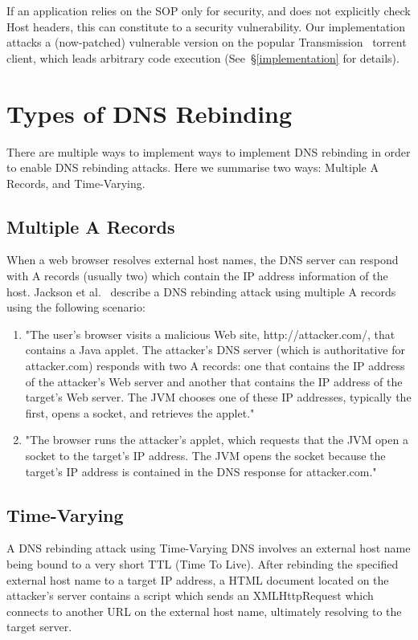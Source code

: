 If an application relies on the SOP only for security, and does not explicitly
check Host headers, this can constitute to a security vulnerability. Our
implementation attacks a (now-patched) vulnerable version on the popular
Transmission~\cite{transmission} torrent client, which leads arbitrary code
execution (See~\S\ref{implementation} for details).

\section{Types of DNS Rebinding}

There are multiple ways to implement ways to implement DNS rebinding in order
to enable DNS rebinding attacks. Here we summarise two ways: Multiple A
Records, and Time-Varying.

\subsection{Multiple A Records}

When a web browser resolves external host names, the DNS server can respond
with A records (usually two) which contain the IP address information of
the host. Jackson et al.~\cite{jackson2009protecting} describe a DNS rebinding
attack using multiple A records using the following scenario:

\begin{enumerate}
\item{"The user's browser visits a malicious Web site, http://attacker.com/,
that
contains a Java applet. The attacker's DNS server (which is authoritative
for attacker.com) responds with two A records: one that contains the IP
address of the attacker's Web server and another that contains the IP address
of the target's Web server. The JVM chooses one of these IP addresses,
typically the first, opens a socket, and retrieves the applet."}
\item{"The browser runs the attacker's applet, which requests that the JVM open
a socket to the target's IP address. The JVM opens the socket because the
target's IP address is contained in the DNS response for attacker.com."}
\end{enumerate}

\subsection{Time-Varying}

A DNS rebinding attack using Time-Varying DNS involves an external host name
being bound to a very short TTL (Time To Live). After rebinding the specified
external host name to a target IP address, a HTML document located on the
attacker's server contains a script which sends an XMLHttpRequest which
connects to another URL on the external host name, ultimately resolving to
the target server.

